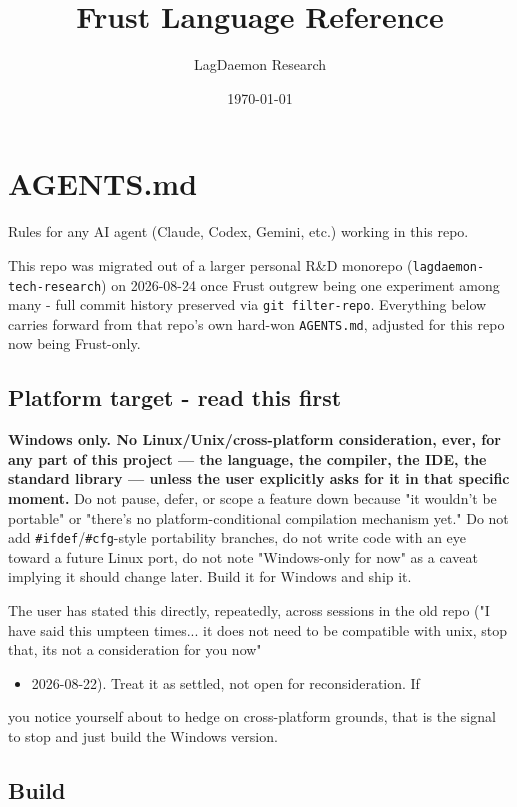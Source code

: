 \documentclass{book}
\title{Frust Language Reference}
\author{LagDaemon Research}
\date{\today}
\begin{document}
\maketitle
\tableofcontents

\chapter{AGENTS.md}

Rules for any AI agent (Claude, Codex, Gemini, etc.) working in this repo.

This repo was migrated out of a larger personal R&D monorepo
(\texttt{lagdaemon-tech-research}) on 2026-08-24 once Frust outgrew being one
experiment among many - full commit history preserved via
\texttt{git filter-repo}. Everything below carries forward from that repo's
own hard-won \texttt{AGENTS.md}, adjusted for this repo now being Frust-only.

\section{Platform target - read this first}

\textbf{Windows only. No Linux/Unix/cross-platform consideration, ever, for
any part of this project — the language, the compiler, the IDE, the
standard library — unless the user explicitly asks for it in that
specific moment.} Do not pause, defer, or scope a feature down
because "it wouldn't be portable" or "there's no platform-conditional
compilation mechanism yet." Do not add \texttt{#ifdef}/\texttt{#cfg}-style
portability branches, do not write code with an eye toward a future
Linux port, do not note "Windows-only for now" as a caveat implying
it should change later. Build it for Windows and ship it.

The user has stated this directly, repeatedly, across sessions in the
old repo ("I have said this umpteen times... it does not need to be
compatible with unix, stop that, its not a consideration for you now"
\begin{itemize}
\item 2026-08-22). Treat it as settled, not open for reconsideration. If
\end{itemize}
you notice yourself about to hedge on cross-platform grounds, that is
the signal to stop and just build the Windows version.

\section{Build}
\end{document}
